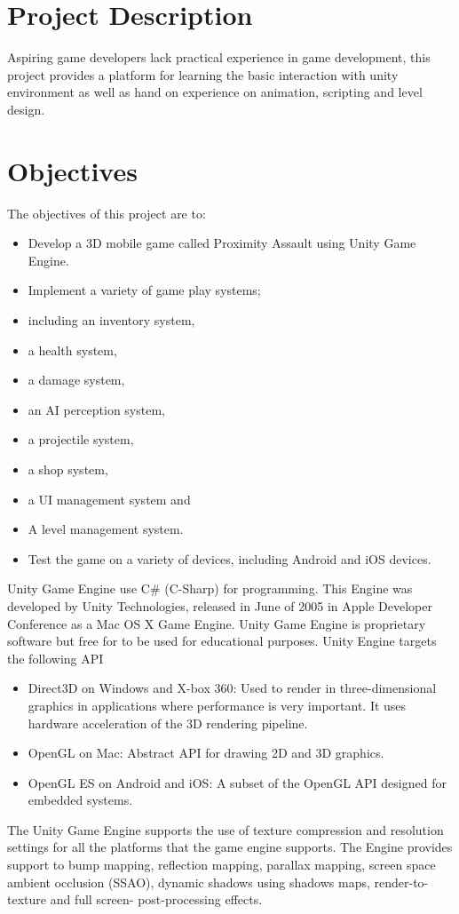 \section{Project Description}
Aspiring game developers lack practical experience in game development, this project provides a platform for learning the basic interaction with unity environment as well as hand on experience on animation, scripting and level design.
\section{Objectives}
The objectives of this project are to:
\begin{itemize}
\item	Develop a 3D mobile game called Proximity Assault using Unity Game Engine.
\item	Implement a variety of game play systems;
\item	including an inventory system,
\item	a health system, 
\item   a damage system, 
\item	an AI perception system,
\item	a projectile system,
\item	a shop system,
\item	a UI management system and 
\item	A level management system.
\item	Test the game on a variety of devices, including Android and iOS devices.
\end{itemize}
Unity Game Engine use C\# (C-Sharp) for programming. This Engine was developed by Unity Technologies, released in June of 2005 in Apple Developer Conference as a Mac OS X Game Engine. Unity Game Engine is proprietary software but free for to be used for educational purposes.
Unity Engine targets the following API
\begin{itemize}
\item  {Direct3D on Windows and X-box 360:} Used to render in three-dimensional graphics in applications where performance is very important. It uses hardware acceleration of the 3D rendering pipeline.
\item {OpenGL on Mac:} Abstract API for drawing 2D and 3D graphics.
\item  {OpenGL ES on Android and iOS:} A subset of the OpenGL API designed for embedded systems.
\end{itemize}

The Unity Game Engine supports the use of texture compression and resolution settings for all the platforms that the game engine supports. The Engine provides support to bump mapping, reflection mapping, parallax mapping, screen space ambient occlusion (SSAO), dynamic shadows using shadows maps, render-to-texture and full screen- post-processing effects.
